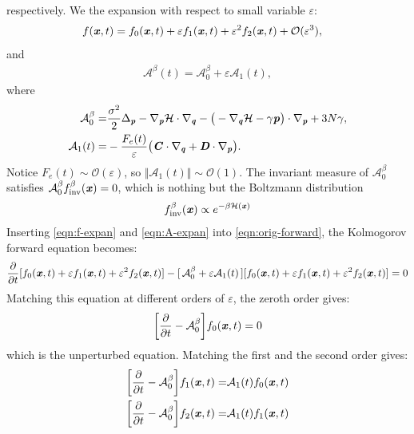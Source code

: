 \documentclass[aip,jcp,a4paper,reprint,onecolumn]{revtex4-1}
\newcommand{\vect}[1]{\textbf{\textit{#1}}}
\newcommand{\inv}{\textrm{inv}}
\newcommand{\mh}{\mathcal H}
\newcommand{\mo}{\mathcal O}
\newcommand{\fwg}{{\mathcal A}}
\begin{document}
respectively. We the expansion with respect to small
variable $\varepsilon$:
\begin{align}\label{eqn:f-expan}
  f(\vect x, t) &= f_0(\vect x, t) + \varepsilon f_1(\vect x, t)
  +\varepsilon^2 f_2(\vect x, t) + \mo (\varepsilon^3),
\end{align}
and 
\begin{align}\label{eqn:A-expan}
  \fwg^\beta(t) = \fwg^\beta_0 + \varepsilon\fwg_1(t),
\end{align}
where
\begin{align}
  \fwg_0^\beta =&
  \frac{\sigma^2}2\Delta_{\vect p}
  -
  \nabla_{\vect p}\mh\cdot\nabla_{\vect q}
  - \big(
  -\nabla_{\vect q}\mh - \gamma\vect p
  \big)\cdot\nabla_{\vect p}
  + 3N\gamma,\\
  \fwg_1(t) =&
  - \frac{F_e(t)}{\varepsilon} \big(
  \vect C \cdot\nabla_{\vect q}
  +
  \vect D \cdot\nabla_{\vect p}
  \big).
\end{align}
Notice $F_e(t) \sim \mo(\varepsilon)$, so $\Vert\fwg_1(t)\Vert\sim\mo(1)$.
The invariant measure of $\fwg^\beta_0$ satisfies $\fwg^\beta_0f^\beta_{\inv}(\vect x) = 0$,
which is nothing but the Boltzmann distribution
\begin{align}
  f^\beta_{\inv}(\vect x) \propto e^{-\beta\mh(\vect x)}
\end{align}
Inserting \eqref{eqn:f-expan} and \eqref{eqn:A-expan} into
\eqref{eqn:orig-forward}, 
the Kolmogorov forward equation becomes:
\begin{align}
  \frac{\partial}{\partial t}
  [f_0(\vect x, t) + \varepsilon  f_1(\vect x, t) + \varepsilon^2f_2(\vect x, t)]
  -
  [\,\fwg^\beta_0 + \varepsilon\fwg_1(t)\,]
  [f_0(\vect x, t) + \varepsilon  f_1(\vect x, t) + \varepsilon^2f_2(\vect x, t)]
  = 0
\end{align}
Matching this equation at different orders of $\varepsilon$, the zeroth
order gives:
\begin{align}\label{eqn:e-o0}
  \bigg[
  \frac{\partial}{\partial t}
  - \fwg_0^\beta
  \bigg]
  f_0(\vect x, t)
  = 0
\end{align}
which is the unperturbed equation. Matching the first and the second order gives:
\begin{align}\label{eqn:e-o1}
  \bigg[
  \frac{\partial}{\partial t}
  - \fwg_0^\beta
  \bigg]
  f_1(\vect x, t)
  =&
  \fwg_1(t) f_0(\vect x, t)\\\label{eqn:e-o2}
  \bigg[
  \frac{\partial}{\partial t}
  - \fwg_0^\beta
  \bigg]
  f_2(\vect x, t)
  =&
  \fwg_1(t) f_1(\vect x, t)
\end{align}
\end{document}
